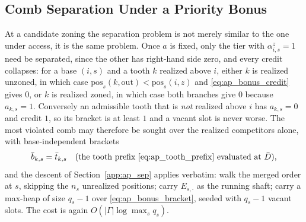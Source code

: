 \documentclass{article}
\begin{document}
\subsection{Comb Separation Under a Priority Bonus}
\label{app:ap_bonus_sep}

At a candidate zoning the separation problem is not merely similar to the one under access, it is the same problem. Once $a$ is fixed, only the tier with $\alpha^{z}_{i,s} = 1$ need be separated, since the other has right-hand side zero, and every credit collapses: for a base $(i,s)$ and a tooth $k$ realized above $i$, either $k$ is realized unzoned, in which case $\mathrm{pos}_s(k,\mathrm{out}) < \mathrm{pos}_s(i,z)$ and \eqref{eq:ap_bonus_credit} gives $0$, or $k$ is realized zoned, in which case both branches give $0$ because $a_{k,s} = 1$. Conversely an admissible tooth that is \emph{not} realized above $i$ has $a_{k,s} = 0$ and credit $1$, so its bracket is at least $1$ and a vacant slot is never worse. The most violated comb may therefore be sought over the realized competitors alone, with base-independent brackets
\begin{equation}\label{eq:ap_bonus_bracket}
\bar b_{k,s} = \bar t_{k,s} \quad\text{(the tooth prefix \eqref{eq:ap_tooth_prefix} evaluated at $\bar D$),}
\end{equation}
and the descent of Section~\ref{app:ap_sep} applies verbatim: walk the merged order at $s$, skipping the $n_s$ unrealized positions; carry $E_{s,\cdot}$ as the running shaft; carry a max-heap of size $q_s - 1$ over \eqref{eq:ap_bonus_bracket}, seeded with $q_s - 1$ vacant slots. The cost is again $O(|\Gamma| \log \max_s q_s)$.
\end{document}
